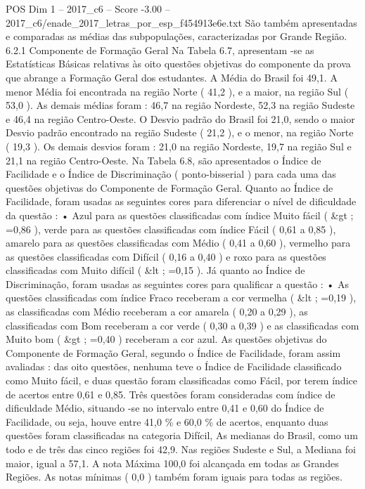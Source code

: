 \begin{textsample}{POS Dim 1 – 2017\_c6 – Score -3.00 – 2017\_c6/enade\_2017\_letras\_por\_esp\_f454913e6e.txt}
São também apresentadas e comparadas as médias das subpopulações, caracterizadas por Grande Região. 6.2.1 Componente de Formação Geral Na Tabela 6.7, apresentam -se as Estatísticas Básicas relativas às oito questões objetivas do componente da prova que abrange a Formação Geral dos estudantes.
A Média do Brasil foi 49,1.
A menor Média foi encontrada na região Norte ( 41,2 ), e a maior, na região Sul ( 53,0 ).
As demais médias foram : 46,7 na região Nordeste, 52,3 na região Sudeste e 46,4 na região Centro-Oeste.
O Desvio padrão do Brasil foi 21,0, sendo o maior Desvio padrão encontrado na região Sudeste ( 21,2 ), e o menor, na região Norte ( 19,3 ).
Os demais desvios foram : 21,0 na região Nordeste, 19,7 na região Sul e 21,1 na região Centro-Oeste.
Na Tabela 6.8, são apresentados o Índice de Facilidade e o Índice de Discriminação ( ponto-bisserial ) para cada uma das questões objetivas do Componente de Formação Geral.
Quanto ao Índice de Facilidade, foram usadas as seguintes cores para diferenciar o nível de dificuldade da questão : • Azul para as questões classificadas com índice Muito fácil ( \&gt ; =0,86 ), verde para as questões classificadas com índice Fácil ( 0,61 a 0,85 ), amarelo para as questões classificadas com Médio ( 0,41 a 0,60 ), vermelho para as questões classificadas com Difícil ( 0,16 a 0,40 ) e roxo para as questões classificadas com Muito difícil ( \&lt ; =0,15 ).
Já quanto ao Índice de Discriminação, foram usadas as seguintes cores para qualificar a questão : • As questões classificadas com índice Fraco receberam a cor vermelha ( \&lt ; =0,19 ), as classificadas com Médio receberam a cor amarela ( 0,20 a 0,29 ), as classificadas com Bom receberam a cor verde ( 0,30 a 0,39 ) e as classificadas com Muito bom ( \&gt ; =0,40 ) receberam a cor azul.
As questões objetivas do Componente de Formação Geral, segundo o Índice de Facilidade, foram assim avaliadas : das oito questões, nenhuma teve o Índice de Facilidade classificado como Muito fácil, e duas questão foram classificadas como Fácil, por terem índice de acertos entre 0,61 e 0,85.
Três questões foram consideradas com índice de dificuldade Médio, situando -se no intervalo entre 0,41 e 0,60 do Índice de Facilidade, ou seja, houve entre 41,0 \% e 60,0 \% de acertos, enquanto duas questões foram classificadas na categoria Difícil, As medianas do Brasil, como um todo e de três das cinco regiões foi 42,9.
Nas regiões Sudeste e Sul, a Mediana foi maior, igual a 57,1.
A nota Máxima 100,0 foi alcançada em todas as Grandes Regiões.
As notas mínimas ( 0,0 ) também foram iguais para todas as regiões.

\end{textsample}
